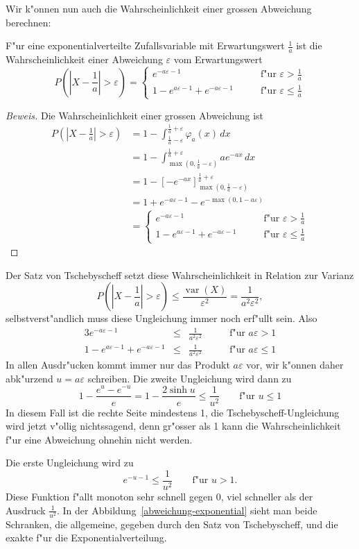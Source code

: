 {
\small
Wir k"onnen nun auch die Wahrscheinlichkeit einer grossen Abweichung
berechnen:
\begin{satz} F"ur eine exponentialverteilte Zufallsvariable mit
Erwartungswert $\frac1a$ ist die Wahrscheinlichkeit einer Abweichung
$\varepsilon$ vom Erwartungswert
\[
P(|X-{\textstyle\frac1a}|>\varepsilon)=
\begin{cases}
e^{-a\varepsilon-1}&\qquad\text{f"ur $\varepsilon > \frac1a$}\\
1-e^{a\varepsilon-1}+e^{-a\varepsilon-1}&\qquad\text{f"ur $\varepsilon \le \frac1a$}
\end{cases}
\]
\end{satz}
\begin{proof}[Beweis]
Die Wahrscheinlichkeit einer grossen Abweichung ist
\begin{align*}
P(|X-{\textstyle\frac1a}|>\varepsilon)
&=1-\int_{\frac1a-\varepsilon}^{\frac1a+\varepsilon}\varphi_a(x)\,dx\\
&=1-\int_{\max(0,\frac1a-\varepsilon)}^{\frac1a+\varepsilon}ae^{-ax}\,dx\\
&=1-\left[-e^{-ax}\right]_{\max(0,\frac1a-\varepsilon)}^{\frac1a+\varepsilon}\\
&=1+e^{-a\varepsilon-1}-e^{-\max(0,1-a\varepsilon)}\\
&=\begin{cases}
e^{-a\varepsilon-1}&\qquad\text{f"ur $\varepsilon > \frac1a$}\\
1-e^{a\varepsilon-1}+e^{-a\varepsilon-1}&\qquad\text{f"ur $\varepsilon \le \frac1a$}
\end{cases}
\end{align*}
\end{proof}
Der Satz von Tschebyscheff setzt diese Wahrscheinlichkeit in Relation
zur Varianz
\[
P(|X-{\textstyle\frac1a}|>\varepsilon)\le
\frac{\operatorname{var}(X)}{\varepsilon^2}=\frac{1}{a^2\varepsilon^2},
\]
selbstverst"andlich muss diese Ungleichung immer noch erf"ullt sein.
Also
\begin{alignat*}{3}
e^{-a\varepsilon-1}&\le&\frac1{a^2\varepsilon^2}&\qquad\text{f"ur $a\varepsilon>1$}\\
1-e^{a\varepsilon-1}+e^{-a\varepsilon-1}&\le&\frac1{a^2\varepsilon^2}&\qquad\text{f"ur $a\varepsilon\le1$}
\end{alignat*}
In allen Ausdr"ucken kommt immer nur das Produkt $a\varepsilon$ vor,
wir k"onnen daher
abk"urzend $u=a\varepsilon$ schreiben.
Die zweite Ungleichung wird dann zu
\[
1-\frac{e^{u}-e^{-u}}e=1-\frac{2\sinh u}{e}\le\frac1{u^2}\qquad\text{f"ur $u\le1$}
\]
In diesem Fall ist die rechte Seite mindestens 1,
die Tschebyscheff-Ungleichung wird jetzt v"ollig nichtssagend, denn 
gr"osser als 1 kann die Wahrscheinlichkeit f"ur eine Abweichung ohnehin
nicht werden.

Die erste Ungleichung wird zu
\[
e^{-u-1}\le\frac1{u^2}\qquad\text{f"ur $u > 1$}.
\]
Diese Funktion f"allt monoton sehr schnell gegen 0, viel schneller
als der Ausdruck $\frac1{u^2}$.
In der Abbildung~\ref{abweichung-exponential}
sieht man beide Schranken, die allgemeine, gegeben durch den
Satz von Tschebyscheff, und die exakte f"ur die Exponentialverteilung.
}

